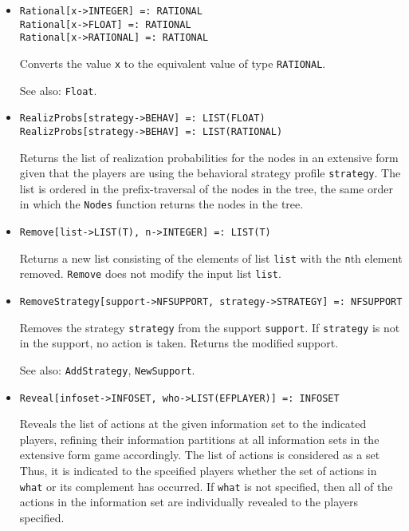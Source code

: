 \begin{itemize}
\item
\protect \large \begin{verbatim}
Rational[x->INTEGER] =: RATIONAL
Rational[x->FLOAT] =: RATIONAL
Rational[x->RATIONAL] =: RATIONAL
\end{verbatim} \normalsize

\bd
Converts the value \verb+x+ to the equivalent value of
type {\tt RATIONAL}.
\item
[See also:] {\tt Float}.
\ed

\item
\protect \large \begin{verbatim}
RealizProbs[strategy->BEHAV] =: LIST(FLOAT)
RealizProbs[strategy->BEHAV] =: LIST(RATIONAL)
\end{verbatim}\normalsize

\bd
Returns the list of realization probabilities for the
nodes in an extensive form given that the players are using the behavioral
strategy profile \verb+strategy+.  The list is ordered in the prefix-traversal
of the nodes in the tree, the same order in which the {\tt Nodes} function
returns the nodes in the tree.
\ed

\item
\protect \large \begin{verbatim}
Remove[list->LIST(T), n->INTEGER] =: LIST(T)
\end{verbatim}\normalsize

\bd
Returns a new list consisting of the elements of list
\verb+list+ with the \verb+n+th element removed.  {\tt Remove} does not
modify the input list \verb+list+.
\ed

\item
\protect \large \begin{verbatim}
RemoveStrategy[support->NFSUPPORT, strategy->STRATEGY] =: NFSUPPORT
\end{verbatim}\normalsize

\bd
Removes the strategy \verb+strategy+ from the
support \verb+support+.  If \verb+strategy+ is not in the support,
no action is taken.  Returns the modified support.
\item
[See also:] {\tt AddStrategy}, {\tt NewSupport}.
\ed

\item
\protect \large \begin{verbatim}
Reveal[infoset->INFOSET, who->LIST(EFPLAYER)] =: INFOSET
\end{verbatim}\normalsize

\bd
Reveals the list of actions at the given information
set to the indicated players, refining their information partitions at
all information sets in the extensive form game accordingly.  The list
of actions is considered as a set Thus, it is indicated to the
spceified players whether the set of actions in \verb+what+ or its
complement has occurred.  If \verb+what+ is not specified, then all of
the actions in the information set are individually revealed to
the players specified.  
\ed



\end{itemize}
